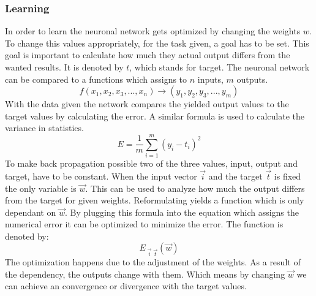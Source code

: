 \documentclass[12pt]{article}
\begin{document}
\subsubsection{Learning}\label{learning}
In order to learn the \gls{neuronal network} gets optimized by changing the \glspl{weight} $w$. To change this values appropriately, for the task given, a goal has to be set. This goal is important to calculate how much they actual output differs from the wanted results. It is denoted by $t$, which stands for \gls{target}. The \gls{neuronal network} can be compared to a functions which assigns to $n$ \glspl{input}, $m$ \glspl{output}.
\begin{equation}
    f(x_{1},x_{2},x_{3},...,x_{n}) \rightarrow (y_{1},y_{2},y_{3},...,y_{m})
\end{equation}
With the data given the network compares the yielded \gls{output} values to the target values by calculating the error. A similar formula is used to calculate the variance in statistics.
\begin{equation}
   E = \frac{1}{m}\sum_{i=1}^{m}\left ( y_{i}- t_{i} \right )^{2}
\end{equation}
To make \gls{back propagation} possible two of the three values,  \gls{input}, \gls{output} and \gls{target}, have to be constant. When the \gls{input} \gls{vector} $\vec{i}$ and the target $\vec{t}$ is fixed the only variable is $\vec{w}$. This can be used to analyze how much the \gls{output} differs from the \gls{target} for given \glspl{weight}. Reformulating yields a function which is only dependant on $\vec{w}$. By plugging this formula into the equation which assigns the numerical error it can be optimized to minimize the error. The function is denoted by:
\begin{equation}
E_{\;\vec{i}\;\vec{t}}(\vec{w})
\end{equation}
The \gls{optimization} happens due to the adjustment of the \glspl{weight}. As a result of the dependency, the \glspl{output} change with them. Which means by changing $\vec{w}$ we can achieve an \gls{convergence} or \gls{divergence} with the target values.
\end{document}
